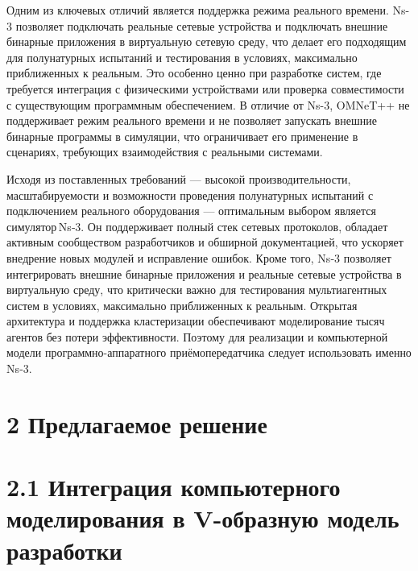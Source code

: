 Одним из ключевых отличий является поддержка режима реального времени.
Ns-3 позволяет подключать реальные сетевые устройства и подключать
внешние бинарные приложения в виртуальную сетевую среду, что делает его
подходящим для полунатурных испытаний и тестирования в условиях,
максимально приближенных к реальным. Это особенно ценно при разработке
систем, где требуется интеграция с физическими устройствами или проверка
совместимости с существующим программным обеспечением. В отличие от
Ns-3, OMNeT++ не поддерживает режим реального времени и не позволяет
запускать внешние бинарные программы в симуляции, что ограничивает его
применение в сценариях, требующих взаимодействия с реальными системами.

Исходя из поставленных требований --- высокой производительности,
масштабируемости и возможности проведения полунатурных испытаний с
подключением реального оборудования --- оптимальным выбором является
симулятор\,Ns‑3. Он поддерживает полный стек сетевых протоколов,
обладает активным сообществом разработчиков и обширной документацией,
что ускоряет внедрение новых модулей и исправление ошибок. Кроме того,
Ns‑3 позволяет интегрировать внешние бинарные приложения и реальные
сетевые устройства в виртуальную среду, что критически важно для
тестирования мультиагентных систем в условиях, максимально приближенных
к реальным. Открытая архитектура и поддержка кластеризации обеспечивают
моделирование тысяч агентов без потери эффективности. Поэтому для
реализации и компьютерной модели программно-аппаратного
приёмопередатчика следует использовать именно Ns‑3.

\section*{\texorpdfstring{2 Предлагаемое решение
}{2 Предлагаемое решение }}\label{ux43fux440ux435ux434ux43bux430ux433ux430ux435ux43cux43eux435-ux440ux435ux448ux435ux43dux438ux435}

\section*{2.1 Интеграция компьютерного моделирования в V-образную модель
разработки}\label{ux438ux43dux442ux435ux433ux440ux430ux446ux438ux44f-ux43aux43eux43cux43fux44cux44eux442ux435ux440ux43dux43eux433ux43e-ux43cux43eux434ux435ux43bux438ux440ux43eux432ux430ux43dux438ux44f-ux432-v-ux43eux431ux440ux430ux437ux43dux443ux44e-ux43cux43eux434ux435ux43bux44c-ux440ux430ux437ux440ux430ux431ux43eux442ux43aux438}

